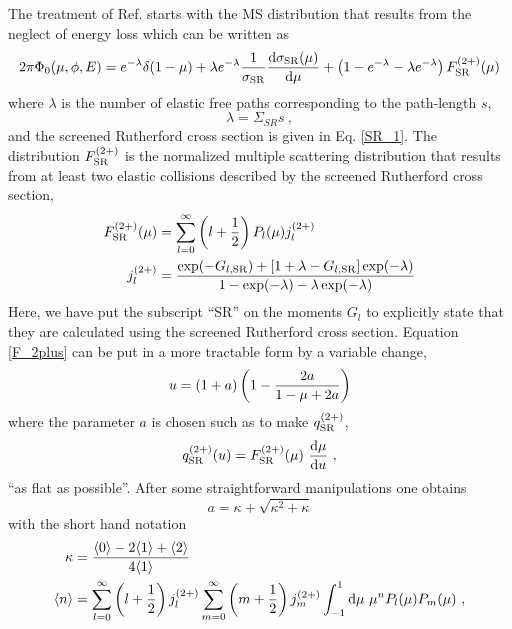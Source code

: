 The treatment of Ref. \cite{KB97} starts with the MS distribution
that results from the neglect of energy loss which can be written
as
\begin{equation}
2 \pi \Phi_0(\mu,\phi,E) = e^{-\lambda} \delta(1 - \mu)
+ \lambda e^{-\lambda} {1 \over \sigma_{\rm SR}}
{{\rm d} \sigma_{\rm SR}(\mu) \over {\rm d}\mu} +
\left(1 - e^{-\lambda} - \lambda e^{-\lambda} \right) F^{(2+)}_{\rm SR} (\mu)
\end{equation}
where $\lambda$ is the number of elastic free paths corresponding
to the path-length $s$,
\begin{equation}
\label{lambda}
\lambda = \Sigma_{SR} s~,
\end{equation}
and the screened Rutherford cross section
is given in Eq. \eqref{SR_1}.
The distribution $F^{(2+)}_{\rm SR}$ is the normalized multiple
scattering distribution
that results from at least two elastic collisions described by
the screened Rutherford cross section,
\begin{equation}
\label{F_2plus}
\begin{split}
F^{(2+)}_{\rm SR}(\mu) & = \sum_{l=0}^\infty \left(l + \frac{1}{2} \right)
P_l(\mu) j_l^{(2+)}  \\
j_l^{(2+)} & = { \exp(-G_{l, {\rm SR}}) +
\left[ 1 + \lambda - G_{l,{\rm SR}} \right] \exp(-\lambda)
\over 1 - \exp(-\lambda) - \lambda \exp(-\lambda) }
\end{split}
\end{equation}
Here, we have put the subscript ``SR'' on the moments $G_l$
to explicitly state that they are calculated
using the screened Rutherford cross section.
Equation \eqref{F_2plus} can be put in a more tractable form
by a variable change,
\begin{equation}
u = (1 + a) \left(1 - {2 a \over 1 - \mu + 2 a} \right)
\end{equation}
where the parameter $a$ is chosen such as to make $q^{(2+)}_{\rm SR}$,
\begin{equation}
q^{(2+)}_{\rm SR}(u) = F^{(2+)}_{\rm SR}(\mu)~{{\rm d} \mu \over {\rm d} u}~,
\end{equation}
``as flat as possible''. After some
straightforward manipulations one obtains \cite{KB97}
\begin{equation}
\label{a-kappa}
a = \kappa + \sqrt{\kappa^2 + \kappa}
\end{equation}
with the short hand notation
\begin{equation}
\label{kappa}
\begin{split}
\kappa & = {\langle 0\rangle - 2 \langle 1\rangle +
          \langle 2\rangle \over 4 \langle 1\rangle } \\
\langle n\rangle & =
\sum_{l=0}^\infty \left( l + {1 \over 2} \right) j_l^{(2+)}
      \sum_{m=0}^\infty \left( m + {1 \over 2} \right) j_m^{(2+)}
      \int_{-1}^1 {\rm d} \mu~ \mu^n P_l(\mu) P_m(\mu)~,
\end{split}
\end{equation}
